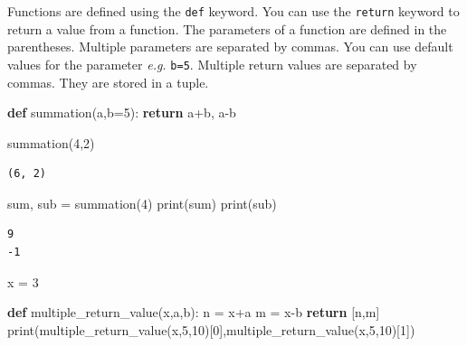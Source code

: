 \documentclass[
  letterpaper,
  DIV=11,
  numbers=noendperiod]{scrreprt}
\newenvironment{Shaded}{\begin{snugshade}}{\end{snugshade}}
\newcommand{\BuiltInTok}[1]{\textcolor[rgb]{0.00,0.23,0.31}{#1}}
\newcommand{\ControlFlowTok}[1]{\textcolor[rgb]{0.00,0.23,0.31}{\textbf{#1}}}
\newcommand{\DecValTok}[1]{\textcolor[rgb]{0.68,0.00,0.00}{#1}}
\newcommand{\KeywordTok}[1]{\textcolor[rgb]{0.00,0.23,0.31}{\textbf{#1}}}
\newcommand{\NormalTok}[1]{\textcolor[rgb]{0.00,0.23,0.31}{#1}}
\newcommand{\OperatorTok}[1]{\textcolor[rgb]{0.37,0.37,0.37}{#1}}
\begin{document}

Functions are defined using the \texttt{def} keyword. You can use the
\texttt{return} keyword to return a value from a function. The
parameters of a function are defined in the parentheses. Multiple
parameters are separated by commas. You can use default values for the
parameter \emph{e.g.} \texttt{b=5}. Multiple return values are separated
by commas. They are stored in a tuple.

\begin{Shaded}
\begin{Highlighting}[]
\KeywordTok{def}\NormalTok{ summation(a,b}\OperatorTok{=}\DecValTok{5}\NormalTok{):}
    \ControlFlowTok{return}\NormalTok{ a}\OperatorTok{+}\NormalTok{b, a}\OperatorTok{{-}}\NormalTok{b}
\end{Highlighting}
\end{Shaded}

\begin{Shaded}
\begin{Highlighting}[]
\NormalTok{summation(}\DecValTok{4}\NormalTok{,}\DecValTok{2}\NormalTok{)}
\end{Highlighting}
\end{Shaded}

\begin{verbatim}
(6, 2)
\end{verbatim}

\begin{Shaded}
\begin{Highlighting}[]
\BuiltInTok{sum}\NormalTok{, sub }\OperatorTok{=}\NormalTok{ summation(}\DecValTok{4}\NormalTok{)}
\BuiltInTok{print}\NormalTok{(}\BuiltInTok{sum}\NormalTok{)}
\BuiltInTok{print}\NormalTok{(sub)}
\end{Highlighting}
\end{Shaded}

\begin{verbatim}
9
-1
\end{verbatim}

\begin{Shaded}
\begin{Highlighting}[]
\NormalTok{x }\OperatorTok{=} \DecValTok{3}

\KeywordTok{def}\NormalTok{ multiple\_return\_value(x,a,b):}
\NormalTok{    n }\OperatorTok{=}\NormalTok{ x}\OperatorTok{+}\NormalTok{a}
\NormalTok{    m }\OperatorTok{=}\NormalTok{ x}\OperatorTok{{-}}\NormalTok{b}
    \ControlFlowTok{return}\NormalTok{ [n,m]}
\BuiltInTok{print}\NormalTok{(multiple\_return\_value(x,}\DecValTok{5}\NormalTok{,}\DecValTok{10}\NormalTok{)[}\DecValTok{0}\NormalTok{],multiple\_return\_value(x,}\DecValTok{5}\NormalTok{,}\DecValTok{10}\NormalTok{)[}\DecValTok{1}\NormalTok{])}
\end{Highlighting}
\end{Shaded}
\end{document}

